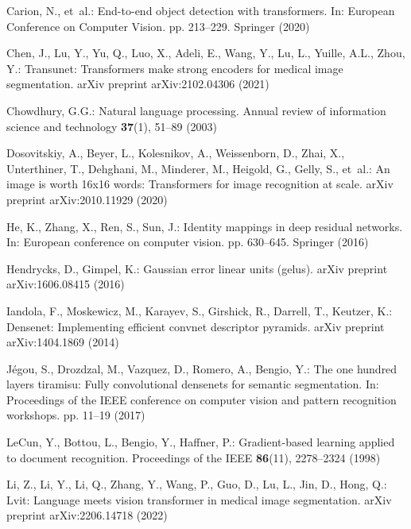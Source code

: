 \documentclass[runningheads]{llncs}
\begin{document}
\bigskip

\begin{thebibliography}{10}
\providecommand{\url}[1]{\texttt{#1}}
\providecommand{\urlprefix}{URL }
\providecommand{\doi}[1]{https://doi.org/#1}

Carion, N., et~al.: End-to-end object detection with transformers. In: European
  Conference on Computer Vision. pp. 213--229. Springer (2020)

Chen, J., Lu, Y., Yu, Q., Luo, X., Adeli, E., Wang, Y., Lu, L., Yuille, A.L.,
  Zhou, Y.: Transunet: Transformers make strong encoders for medical image
  segmentation. arXiv preprint arXiv:2102.04306  (2021)

Chowdhury, G.G.: Natural language processing. Annual review of information
  science and technology  \textbf{37}(1),  51--89 (2003)

Dosovitskiy, A., Beyer, L., Kolesnikov, A., Weissenborn, D., Zhai, X.,
  Unterthiner, T., Dehghani, M., Minderer, M., Heigold, G., Gelly, S., et~al.:
  An image is worth 16x16 words: Transformers for image recognition at scale.
  arXiv preprint arXiv:2010.11929  (2020)

He, K., Zhang, X., Ren, S., Sun, J.: Identity mappings in deep residual
  networks. In: European conference on computer vision. pp. 630--645. Springer
  (2016)

Hendrycks, D., Gimpel, K.: Gaussian error linear units (gelus). arXiv preprint
  arXiv:1606.08415  (2016)

Iandola, F., Moskewicz, M., Karayev, S., Girshick, R., Darrell, T., Keutzer,
  K.: Densenet: Implementing efficient convnet descriptor pyramids. arXiv
  preprint arXiv:1404.1869  (2014)

J{\'e}gou, S., Drozdzal, M., Vazquez, D., Romero, A., Bengio, Y.: The one
  hundred layers tiramisu: Fully convolutional densenets for semantic
  segmentation. In: Proceedings of the IEEE conference on computer vision and
  pattern recognition workshops. pp. 11--19 (2017)

LeCun, Y., Bottou, L., Bengio, Y., Haffner, P.: Gradient-based learning applied
  to document recognition. Proceedings of the IEEE  \textbf{86}(11),
  2278--2324 (1998)

Li, Z., Li, Y., Li, Q., Zhang, Y., Wang, P., Guo, D., Lu, L., Jin, D., Hong,
  Q.: Lvit: Language meets vision transformer in medical image segmentation.
  arXiv preprint arXiv:2206.14718  (2022)


\end{thebibliography}
\end{document}
